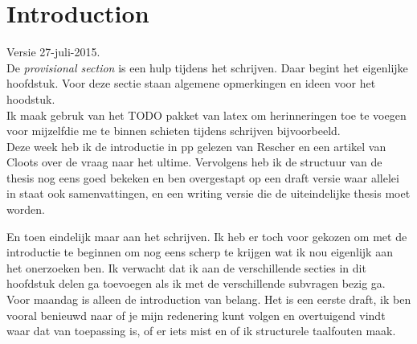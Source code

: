 \documentclass[a4paper]{Thesis}
\begin{document}





\chapter{Introduction}

Versie 27-juli-2015.\\

De \textit{provisional section} is een hulp tijdens het schrijven. Daar begint het eigenlijke hoofdstuk. Voor deze sectie staan algemene opmerkingen en ideen voor het hoodstuk.\\


Ik maak gebruk van het TODO pakket van latex om herinneringen toe te voegen voor mijzelfdie me te binnen schieten tijdens schrijven bijvoorbeeld.\\


Deze week heb ik de introductie in pp gelezen van Rescher en een artikel van Cloots over de vraag naar het ultime. Vervolgens heb ik de structuur van de thesis nog eens goed bekeken en ben overgestapt op een draft versie waar allelei in staat ook samenvattingen, en een writing versie die de uiteindelijke thesis moet worden.

En toen eindelijk maar aan het schrijven. Ik heb er toch voor gekozen om met de introductie te beginnen om nog eens scherp te krijgen wat ik nou eigenlijk aan het onerzoeken ben. Ik verwacht dat ik aan de verschillende secties in dit hoofdstuk delen ga toevoegen als ik met de verschillende subvragen bezig ga.
Voor maandag is alleen de introduction van belang. Het is een eerste draft, ik ben vooral benieuwd naar of je mijn redenering kunt volgen en overtuigend vindt waar dat van toepassing is, of er iets mist en of ik structurele taalfouten maak.\\
\end{document}

